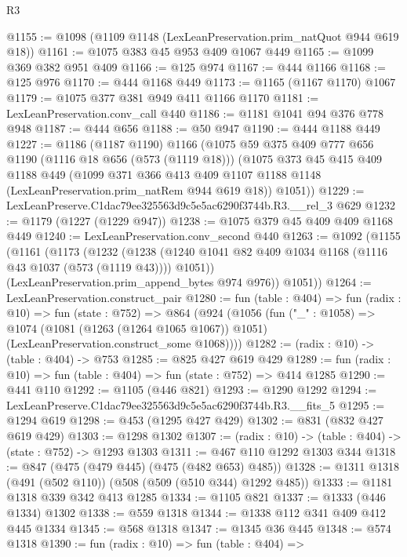 \begin{lexlean}{R3}
\begin{coremodule}
@1155 := @1098 (@1109 @1148 (LexLeanPreservation.prim_natQuot @944 @619 @18))
@1161 := @1075 @383 @45 @953 @409 @1067 @449
@1165 := @1099 @369 @382 @951 @409
@1166 := @125 @974
@1167 := @444 @1166
@1168 := @125 @976
@1170 := @444 @1168 @449
@1173 := @1165 (@1167 @1170) @1067
@1179 := @1075 @377 @381 @949 @411 @1166 @1170
@1181 := LexLeanPreservation.conv_call @440
@1186 := @1181 @1041 @94 @376 @778 @948
@1187 := @444 @656
@1188 := @50 @947
@1190 := @444 @1188 @449
@1227 := @1186
    (@1187 @1190)
    @1166
    (@1075
      @59
      @375
      @409
      @777
      @656
      @1190
      (@1116 @18 @656 (@573 (@1119 @18)))
      (@1075
        @373
        @45
        @415
        @409
        @1188
        @449
        (@1099
          @371
          @366
          @413
          @409
          @1107
          @1188
          @1148
          (LexLeanPreservation.prim_natRem @944 @619 @18))
        @1051))
@1229 := LexLeanPreserve.C1dac79ee325563d9c5e5ac6290f3744b.R3.__rel_3 @629
@1232 := @1179 (@1227 (@1229 @947))
@1238 := @1075 @379 @45 @409 @409 @1168 @449
@1240 := LexLeanPreservation.conv_second @440
@1263 := @1092
    (@1155
      (@1161
        (@1173
          (@1232
            (@1238 (@1240 @1041 @82 @409 @1034 @1168 (@1116 @43 @1037 (@573 (@1119 @43)))) @1051))
          (LexLeanPreservation.prim_append_bytes @974 @976))
        @1051))
@1264 := LexLeanPreservation.construct_pair
@1280 := fun (table : @404) =>
  fun (radix : @10) =>
  fun (state : @752) =>
  @864
    (@924
      (@1056
        (fun ("_" : @1058) =>
        @1074
          (@1081 (@1263 (@1264 @1065 @1067)) @1051)
          (LexLeanPreservation.construct_some @1068))))
@1282 := (radix : @10) -> (table : @404) -> @753
@1285 := @825 @427 @619 @429
@1289 := fun (radix : @10) => fun (table : @404) => fun (state : @752) => @414 @1285
@1290 := @441 @110
@1292 := @1105 (@446 @821)
@1293 := @1290 @1292
@1294 := LexLeanPreserve.C1dac79ee325563d9c5e5ac6290f3744b.R3.__fits_5
@1295 := @1294 @619
@1298 := @453 (@1295 @427 @429)
@1302 := @831 (@832 @427 @619 @429)
@1303 := @1298 @1302
@1307 := (radix : @10) -> (table : @404) -> (state : @752) -> @1293 @1303
@1311 := @467 @110 @1292 @1303 @344
@1318 := @847 (@475 (@479 @445) (@475 (@482 @653) @485))
@1328 := @1311 @1318 (@491 (@502 @110)) (@508 (@509 (@510 @344) @1292 @485))
@1333 := @1181 @1318 @339 @342 @413 @1285
@1334 := @1105 @821
@1337 := @1333 (@446 @1334) @1302
@1338 := @559 @1318
@1344 := @1338 @112 @341 @409 @412 @445 @1334
@1345 := @568 @1318
@1347 := @1345 @36 @445
@1348 := @574 @1318
@1390 := fun (radix : @10) =>
  fun (table : @404) =>

\end{coremodule}
\end{lexlean}
